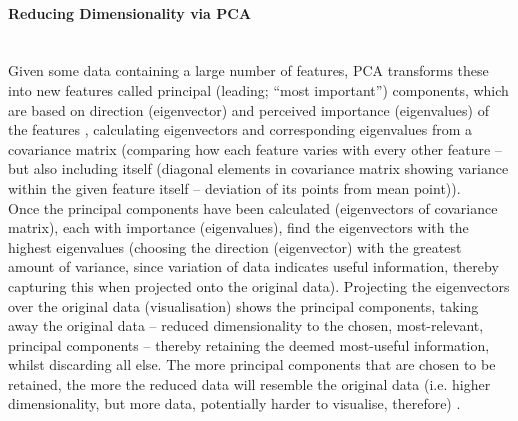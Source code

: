 \paragraph{Reducing Dimensionality via PCA}%
\label{para:reducing_dimensionality_via_pca}
\noindent\\
Given some data containing a large number of features, PCA transforms these into new features called principal (leading; ``most important'') components, which are based on direction (eigenvector) and perceived importance (eigenvalues) of the features \citep{geeks:pca}, calculating eigenvectors and corresponding eigenvalues from a covariance matrix (comparing how each feature varies with every other feature -- but also including itself (diagonal elements in covariance matrix showing variance within the given feature itself -- deviation of its points from mean point)).\\
Once the principal components have been calculated (eigenvectors of covariance matrix), each with importance (eigenvalues), find the eigenvectors with the highest eigenvalues (choosing the direction (eigenvector) with the greatest amount of variance, since variation of data indicates useful information, thereby capturing this when projected onto the original data). Projecting the eigenvectors over the original data (visualisation) shows the principal components, taking away the original data -- reduced dimensionality to the chosen, most-relevant, principal components -- thereby retaining the deemed most-useful information, whilst discarding all else. The more principal components that are chosen to be retained, the more the reduced data will resemble the original data (i.e. higher dimensionality, but more data, potentially harder to visualise, therefore) \citep{geeks:pca}.
